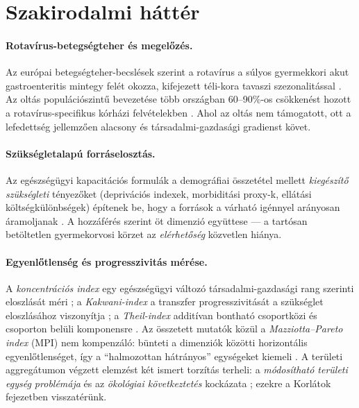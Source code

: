 \documentclass[12pt,a4paper]{article}
\begin{document}
\section{Szakirodalmi háttér}

\paragraph{Rotavírus-betegségteher és megelőzés.}
Az európai betegségteher-becslések szerint a rotavírus a súlyos gyermekkori
akut gastroenteritis mintegy felét okozza, kifejezett téli-kora tavaszi
szezonalitással \citep{soriano2006,ecdc_rota}. Az oltás populációszintű
bevezetése több országban 60--90\%-os csökkenést hozott a
rotavírus-specifikus kórházi felvételekben \citep{who2021rota}. Ahol az oltás
nem támogatott, ott a lefedettség jellemzően alacsony és társadalmi-gazdasági
gradienst követ.

\paragraph{Szükségletalapú forráselosztás.}
Az egészségügyi kapacitációs formulák a demográfiai összetétel mellett
\emph{kiegészítő szükségleti} tényezőket (deprivációs indexek, morbiditási
proxy-k, ellátási költségkülönbségek) építenek be, hogy a források a várható
igénnyel arányosan áramoljanak \citep{rice2001}. A hozzáférés
\citet{penchansky1981} szerint öt dimenzió együttese --- a tartósan
betöltetlen gyermekorvosi körzet az \emph{elérhetőség} közvetlen hiánya.

\paragraph{Egyenlőtlenség és progresszivitás mérése.}
A \emph{koncentrációs index} egy egészségügyi változó társadalmi-gazdasági
rang szerinti eloszlását méri \citep{wagstaff1991,odonnell2008}; a
\emph{Kakwani-index} a transzfer progresszivitását a szükséglet eloszlásához
viszonyítja \citep{kakwani1977}; a \emph{Theil-index} additívan bontható
csoportközi és csoporton belüli komponensre \citep{theil1967}. Az összetett
mutatók közül a \emph{Mazziotta--Pareto index} (MPI) nem kompenzáló: bünteti
a dimenziók közötti horizontális egyenlőtlenséget, így a
\enquote{halmozottan hátrányos} egységeket kiemeli
\citep{mazziotta2013,mazziotta2016}. A területi aggregátumon végzett
elemzést két ismert torzítás terheli: a \emph{módosítható területi egység
problémája} \citep{openshaw1984} és az \emph{ökológiai következtetés}
kockázata \citep{robinson1950}; ezekre a Korlátok fejezetben visszatérünk.
\end{document}
